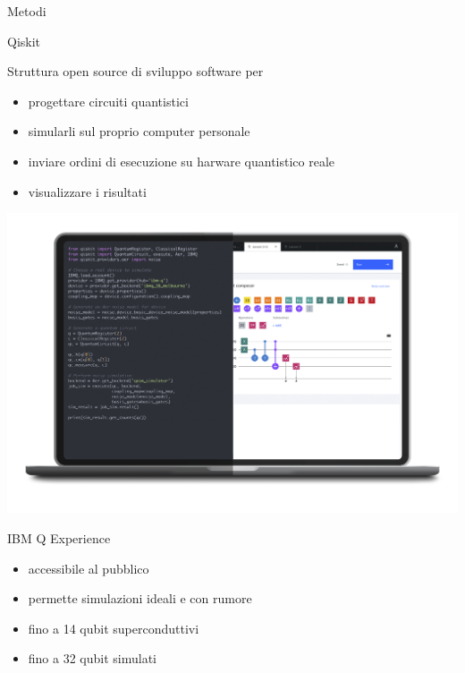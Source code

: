 \documentclass{beamer}
\begin{document}
    \begin{frame}[t]{Metodi}
        \begin{minipage}[t]{.45\textwidth}
            \vspace{0pt}
            \begin{center}
                Qiskit
            \end{center}
            Struttura open source di sviluppo software \cite{Qiskit} per 
            \begin{itemize}
                \item progettare circuiti quantistici
                \item simularli sul proprio computer personale
                \item inviare ordini di esecuzione su harware quantistico reale
                \item visualizzare i risultati
            \end{itemize}
        \end{minipage}
        \hfill
        \begin{minipage}[t]{.45\textwidth}
            \vspace{0pt}
            \begin{center}
                \includegraphics[width=.6\columnwidth]{gfx/laptop_strumenti.png}
            \end{center}
            \begin{center}
                IBM Q Experience
            \end{center}
            \begin{itemize}
                \item accessibile al pubblico
                \item permette simulazioni ideali e con rumore
                \item fino a 14 qubit superconduttivi
                \item fino a 32 qubit simulati
            \end{itemize}
        \end{minipage}
    \end{frame}
\end{document}
